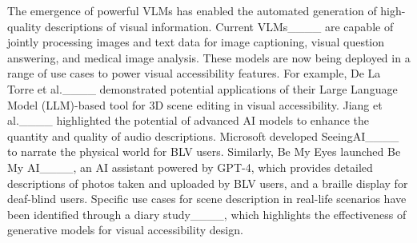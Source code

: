 The emergence of powerful VLMs has enabled the automated generation of high-quality descriptions of visual information.  %
Current VLMs____ are capable of jointly processing images and text data for image captioning, visual question answering, and medical image analysis. %
These models are now being deployed in a range of use cases to power visual accessibility features. 
For example, De La Torre et al.____ demonstrated potential applications of their Large Language Model (LLM)-based tool for 3D scene editing in visual accessibility. Jiang et al.____ highlighted the potential of advanced AI models to enhance the quantity and quality of audio descriptions.
Microsoft developed SeeingAI____ to narrate the physical world for BLV users.
Similarly, Be My Eyes launched Be My AI____, an AI assistant powered by GPT-4, which provides detailed descriptions of photos taken and uploaded by BLV users, and a braille display for deaf-blind users. %
Specific use cases for scene description in real-life scenarios have been identified through a diary study____, which highlights the effectiveness of generative models for visual accessibility design.

